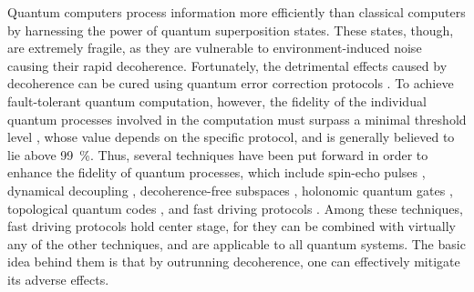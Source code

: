 \documentclass[aps,pra,reprint,a4paper,nofootinbib,superscriptaddress,numbers,longbibliography,showpacs,showkeys,floatfix]{revtex4-1}
\begin{document}
%
%
%
Quantum computers process information more efficiently than classical computers by harnessing the power of quantum superposition states.
%
These states, though, are extremely fragile, as they are vulnerable to environment-induced noise causing their rapid decoherence.
%
%
Fortunately, the detrimental effects caused by decoherence can be cured using
quantum error correction protocols
\cite{Calderbank:1996,Steane:1996a}.
%
To achieve fault-tolerant quantum computation, however, the fidelity of the individual quantum processes involved in the computation must surpass a minimal threshold level \cite{Knill:1998}, whose value depends on the specific protocol, and is generally believed to lie above \SI{99}{\percent}. Thus, several techniques have been put forward in order to enhance the fidelity of quantum processes, which include
spin-echo pulses \cite{Andersen:2003,Kuhr:2005,Kleine-Buning:2011}, dynamical decoupling \cite{Viola:1998,Fortunato:2002,Fraval:2005,Biercuk:2009,Du:2009,Sagi:2010}, decoherence-free subspaces \cite{Home:2009,Timoney:2011,Wang:2016g}, holonomic quantum gates \cite{Pachos:2001,Duan:2001a}, topological quantum codes \cite{Dennis:2002a}, and fast driving protocols \cite{Campbell:2010,Schaefer:2018}.
%
Among these techniques, fast driving protocols hold center stage,
for they can be combined with virtually any of the other techniques, and are applicable to all quantum systems.
%
The basic idea behind them is that by outrunning decoherence, one can effectively mitigate its adverse effects.
%
\end{document}

